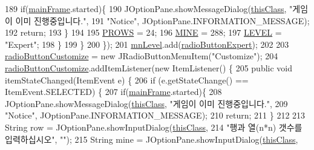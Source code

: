 \begin{DoxyCode}
189                     \textcolor{keywordflow}{if}(\hyperlink{classpkg_1_1main_frame_a0edb10d75697656c940f3b5e3ba7d9ef}{mainFrame}.started)\{
190                         JOptionPane.showMessageDialog(\hyperlink{classpkg_1_1main_frame_aa7857342de44fb7ddfa5d6e2685f71fb}{thisClass}, \textcolor{stringliteral}{"게임이 이미 진행중입니다."},
191                                 \textcolor{stringliteral}{"Notice"}, JOptionPane.INFORMATION\_MESSAGE);
192                         \textcolor{keywordflow}{return};
193                     \}
194                     
195                     \hyperlink{classpkg_1_1main_frame_a6d9a76db81895214a2acaab598dc2a7c}{PROWS} = 24;
196                     \hyperlink{classpkg_1_1main_frame_a2d3b62dc427e3bfd3247b51456d78882}{MINE} = 288;
197                     \hyperlink{classpkg_1_1main_frame_af08a1a3e5a422b15f9ebe173a386de24}{LEVEL} = \textcolor{stringliteral}{"Expert"};
198                 \}
199             \}
200         \});
201         \hyperlink{classpkg_1_1main_frame_adceefa443b0c2344aa1ad15f8da92dac}{mnLevel}.add(\hyperlink{classpkg_1_1main_frame_a3c5879fc83a0488e3cf3d42dda313c13}{radioButtonExpert});
202         
203         \hyperlink{classpkg_1_1main_frame_a0391d895fba86ae5b87b88eb2b8b876e}{radioButtonCustomize} = \textcolor{keyword}{new} JRadioButtonMenuItem(\textcolor{stringliteral}{"Customize"});
204         \hyperlink{classpkg_1_1main_frame_a0391d895fba86ae5b87b88eb2b8b876e}{radioButtonCustomize}.addItemListener(\textcolor{keyword}{new} ItemListener() \{
205             \textcolor{keyword}{public} \textcolor{keywordtype}{void} itemStateChanged(ItemEvent e) \{
206                 \textcolor{keywordflow}{if} (e.getStateChange() == ItemEvent.SELECTED) \{
207                     \textcolor{keywordflow}{if}(\hyperlink{classpkg_1_1main_frame_a0edb10d75697656c940f3b5e3ba7d9ef}{mainFrame}.started)\{
208                         JOptionPane.showMessageDialog(\hyperlink{classpkg_1_1main_frame_aa7857342de44fb7ddfa5d6e2685f71fb}{thisClass}, \textcolor{stringliteral}{"게임이 이미 진행중입니다."},
209                                 \textcolor{stringliteral}{"Notice"}, JOptionPane.INFORMATION\_MESSAGE);
210                         \textcolor{keywordflow}{return};
211                     \}
212                     
213                     String row = JOptionPane.showInputDialog(\hyperlink{classpkg_1_1main_frame_aa7857342de44fb7ddfa5d6e2685f71fb}{thisClass},
214                             \textcolor{stringliteral}{"행과 열(n*n) 갯수를 입력하십시오"}, \textcolor{stringliteral}{""});
215                     String mine = JOptionPane.showInputDialog(\hyperlink{classpkg_1_1main_frame_aa7857342de44fb7ddfa5d6e2685f71fb}{thisClass},

\end{DoxyCode}
